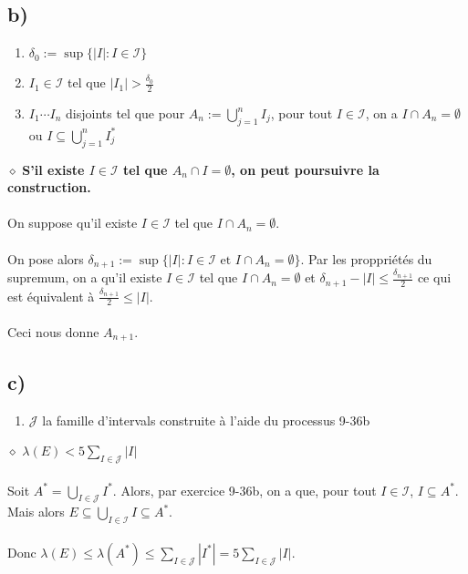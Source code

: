 \documentclass[a4paper,10pt]{article}
\begin{document}
\subsection*{b)}
\begin{enumerate}
	\item $\delta_0 := \sup \{|I| : I \in \mathcal{I} \}$
	\item $I_1 \in \mathcal{I}$ tel que $|I_1| > \frac{\delta_0}{2}$
	\item $I_1 \cdots I_n$ disjoints tel que pour $A_n := \bigcup_{j=1}^n I_j$, pour tout $I \in \mathcal{I}$, on a $I \cap A_n = \emptyset$ ou $I \subseteq \bigcup_{j=1}^n I^*_j$
\end{enumerate}
$\diamond$ \textbf{S'il existe $I \in \mathcal{I}$ tel que $A_n \cap I = \emptyset$, on peut poursuivre la construction.}
\\
\\
On suppose qu'il existe $I \in \mathcal{I}$ tel que $I \cap A_n = \emptyset$.
\\
\\
On pose alors $\delta_{n+1} := \sup \{|I| : I \in \mathcal{I} \text{ et } I \cap A_n = \emptyset\}$. Par les proppriétés du supremum, on a qu'il existe $I \in \mathcal{I}$ tel que $I \cap A_n = \emptyset$ et $\delta_{n+1} - |I| \leq \frac{\delta_{n + 1}}{2}$ ce qui est équivalent à $\frac{\delta_{n+1}}{2} \leq |I|$.
\\
\\
Ceci nous donne $A_{n+1}$.

\subsection*{c)}
\begin{enumerate}
	\item $\mathcal{J}$ la famille d'intervals construite à l'aide du processus 9-36b
\end{enumerate}
$\diamond$ \textbf{$\lambda(E) < 5 \sum_{I \in \mathcal{J}} |I|$}
\\
\\
Soit $A^* = \bigcup_{I \in \mathcal{J}} I^*$. Alors, par exercice 9-36b, on a que, pour tout $I \in \mathcal{I}$, $I \subseteq A^*$. Mais alors $E \subseteq \bigcup_{I \in \mathcal{I}} I \subseteq A^*$.
\\
\\
Donc $\lambda(E) \leq \lambda(A^*) \leq \sum_{I \in \mathcal{J}} |I^*| = 5 \sum_{I \in \mathcal{J}} |I|$.
\end{document}
